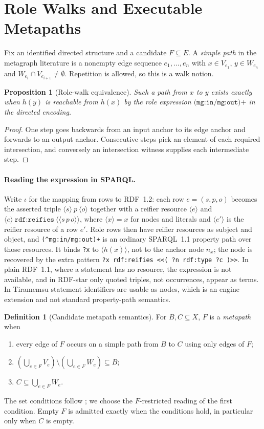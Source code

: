 \documentclass[11pt]{article}
\theoremstyle{plain}
\newtheorem{proposition}[theorem]{Proposition}
\theoremstyle{definition}
\newtheorem{definition}{Definition}
\theoremstyle{remark}
\newcommand{\pathexpr}{\texttt{(\^{}mg:in/mg:out)+}}
\begin{document}
\section{Role Walks and Executable Metapaths}\label{sec:calculus}
Fix an identified directed structure and a candidate $F\subseteq E$. A \emph{simple path}
in the metagraph literature \cite{basu2007metagraphs,parsonage2025tpp} is a nonempty edge
sequence $e_1,\ldots,e_n$ with $x\in V_{e_1}$, $y\in W_{e_n}$ and
$W_{e_i}\cap V_{e_{i+1}}\neq\emptyset$. Repetition is allowed, so this is a walk notion.
\begin{proposition}[Role-walk equivalence]\label{prop:path}
Such a path from $x$ to $y$ exists exactly when $h(y)$ is reachable from $h(x)$ by the
role expression $\pathexpr$ in the directed encoding.
\end{proposition}
\begin{proof}
One step goes backwards from an input anchor to its edge anchor and forwards to an output
anchor. Consecutive steps pick an element of each required intersection, and
conversely an intersection witness supplies each intermediate step.
\end{proof}
\paragraph{Reading the expression in SPARQL.}
Write $\iota$ for the mapping from rows to RDF~1.2: each row $e=(s,p,o)$ becomes the
asserted triple $\langle s\rangle\ p\ \langle o\rangle$ together with a reifier resource
$\langle e\rangle$ and $\langle e\rangle\ \texttt{rdf:reifies}\ \langle\!\langle s\,p\,o\rangle\!\rangle$,
where $\langle x\rangle=x$ for nodes and literals and $\langle e'\rangle$ is the reifier
resource of a row $e'$. Role rows then have reifier resources as subject and object, and
\pathexpr{} is an ordinary SPARQL~1.1 property path over those resources. It binds
\texttt{?x} to $\langle h(x)\rangle$, not to the anchor node $n_x$; the node is
recovered by the extra pattern
\texttt{?x rdf:reifies <<( ?n rdf:type ?c )>>}. In plain RDF~1.1, where a statement has
no resource, the expression is not available, and in RDF-star only quoted triples, not
occurrences, appear as terms. In Tiramemsu statement identifiers are usable as nodes, which
is an engine extension and not standard property-path semantics.

\begin{definition}[Candidate metapath semantics]\label{def:metapath}
For $B,C\subseteq X$, $F$ is a \emph{metapath} when
\begin{enumerate}
\item every edge of $F$ occurs on a simple path from $B$ to $C$ using only edges of $F$;
\item $(\bigcup_{e\in F}V_e)\setminus(\bigcup_{e\in F}W_e)\subseteq B$;
\item $C\subseteq\bigcup_{e\in F}W_e$.
\end{enumerate}
\end{definition}
The set conditions follow \cite{parsonage2025tpp}; we choose the $F$-restricted reading of
the first condition. Empty $F$ is admitted exactly when the conditions hold, in
particular only when $C$ is empty.
\end{document}
